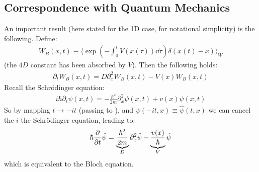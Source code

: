 \documentclass[../template.tex]{subfiles}
\begin{document}
\subsection{Correspondence with Quantum Mechanics}
An important result (here stated for the 1D case, for notational simplicity) is the following. Define:
\begin{align}
    W_B(x,t) \equiv \langle \exp\left(-\int_0^t V(x(\tau)) \dd{\tau}\right) \delta(x(t) - x) \rangle_W
    \label{eqn:Wb}
\end{align}
(the $4D$ constant has been absorbed by $V$). Then the following holds:
\begin{align}
    \partial_t W_B(x,t) = D \partial_x^2 W_B(x,t) - V(x) W_B(x,t)
    \label{eqn:diffusion}
\end{align}
Recall the Schr\"odinger equation:
\begin{align*}
    i\hbar \partial_t \psi(x,t) = -\frac{\hbar^2}{2m} \partial_x^2 \psi(x,t) + v(x) \psi(x,t) 
\end{align*}
So by mapping $t \to -it$ (passing to ), and $\psi(-it, x) \equiv \hat{\psi}(t,x)$  we can cancel the $i$ the Schr\"odinger equation, leading to:
\begin{align*}
    \hbar \pdv{t} \hat{\psi} = \underbrace{\frac{\hbar^2}{2 m}}_{D} \partial_x^2 \hat{\psi} - \underbrace{\frac{v(x)}{\hbar}}_{V}  \hat{\psi}  
\end{align*}
which is equivalent to the Bloch equation.
\end{document}
